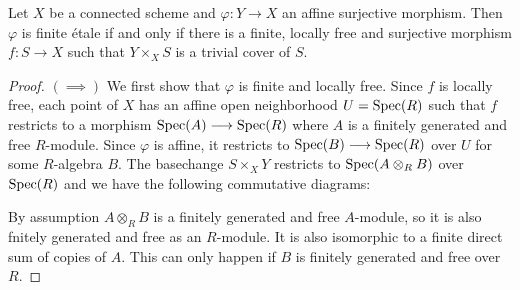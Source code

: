 \begin{theorem} 
  \label{locallyTrivial}
  Let $X$ be a connected scheme and $\varphi : Y \to X$ an affine surjective morphism. Then $\varphi$ is finite \'etale if and only if there is a finite, locally free and surjective morphism $f: S \to X$ such that $Y \times_X S$ is a trivial cover of $S$.
\end{theorem}
\begin{proof}
  $(\implies)$
  We first show that $\varphi$ is finite and locally free. Since $f$ is locally free, each point of $X$ has an affine open neighborhood $U = \operatorname{Spec}(R)$ such that $f$ restricts to a morphism $\operatorname{Spec}(A) \longrightarrow \operatorname{Spec}(R)$ where $A$ is a finitely generated and free $R$-module. Since $\varphi$ is affine, it restricts to $\operatorname{Spec}(B) \longrightarrow \operatorname{Spec}(R)$ over $U$ for some $R$-algebra $B$. The basechange $S \times_X Y$ restricts to $\operatorname{Spec}(A \otimes_R B)$ over $\operatorname{Spec}(R)$ and we have the following commutative diagrams:
    \begin{figure}
    \centering
    \begin{minipage}{0.4\textwidth}
    \end{minipage}
    \begin{minipage}{0.4\textwidth}
    \end{minipage}
  \end{figure}

  By assumption $A \otimes_R B$ is a finitely generated and free $A$-module, so it is also fnitely generated and free as an $R$-module. It is also isomorphic to a finite direct sum of copies of $A$. This can only happen if $B$ is finitely generated and free over $R$. \par


\end{proof}
